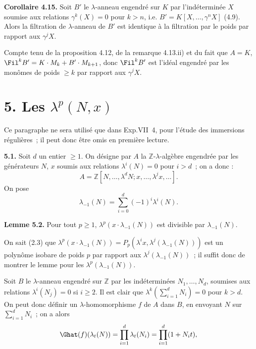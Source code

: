 \textbf{Corollaire 4.15.} Soit \(B'\) le \(\lambda\)-anneau engendré sur \(K\) par l'indéterminée \(X\) soumise aux relations \(\gamma^k(X)=0\) pour \(k>n\), i.e. \(B'=K[X,\ldots,\gamma^n X]\) (4.9). Alors la filtration de \(\lambda\)-anneau de \(B'\) est identique à la filtration par le poids par rapport aux \(\gamma^j X\).

Compte tenu de la proposition 4.12, de la remarque 4.13.ii) et du fait que \(A=K\), \(\Fil^k B'=K\cdot M_k+B'\cdot M_{k+1}\), donc \(\Fil^k B'\) est l'idéal engendré par les monômes de poids \(\ge k\) par rapport aux \(\gamma^j X\).

\section*{5. Les \(\lambda^p(N,x)\)}

Ce paragraphe ne sera utilisé que dans Exp.VII~4, pour l'étude des immersions régulières~; il peut donc être omis en première lecture.

\textbf{5.1.} Soit \(d\) un entier \(\ge1\). On désigne par \(A\) la \(\mathbb Z\)-\(\lambda\)-algèbre engendrée par les générateurs \(N\), \(x\) soumis aux relations \(\lambda^i(N)=0\) pour \(i>d\)~; on a donc :
\[
  A=\mathbb Z[N,\ldots,\lambda^dN;
       x,\ldots,\lambda^jx,\ldots].
\]
On pose
\[
  \lambda_{-1}(N)=\sum_{i=0}^{d}(-1)^i\lambda^i(N).
\]

\textbf{Lemme 5.2.} Pour tout \(p\ge1\), \(\lambda^p(x\cdot\lambda_{-1}(N))\) est divisible par \(\lambda_{-1}(N)\).

On sait (2.3) que \(\lambda^p(x\cdot\lambda_{-1}(N))=P_p(\lambda^i x,\lambda^j(\lambda_{-1}(N)))\) est un polynôme isobare de poids \(p\) par rapport aux \(\lambda^j(\lambda_{-1}(N))\)~; il suffit donc de montrer le lemme pour les \(\lambda^p(\lambda_{-1}(N))\).

Soit \(B\) le \(\lambda\)-anneau engendré sur \(\mathbb Z\) par les indéterminées \(N_1,\ldots,N_d\), soumises aux relations \(\lambda^i(N_j)=0\) si \(i\ge2\). Il est clair que \(\lambda^k(\sum_{i=1}^{d}N_i)=0\) pour \(k>d\). On peut donc définir un \(\lambda\)-homomorphisme \(f\) de \(A\) dans \(B\), en envoyant \(N\) sur \(\sum_{i=1}^{d}N_i\)~; on a alors
\[
  \Ghat(f)(\lambda_t(N))=\prod_{i=1}^{d}\lambda_t(N_i)=\prod_{i=1}^{d}(1+N_it),
\]
